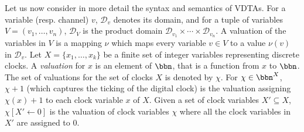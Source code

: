 Let us now consider in more detail the syntax and semantics of VDTAs.
%
For a variable (resp. channel) $v$, ${\mathcal D}_v$ denotes its domain,
and for a tuple of variables $V= (v_1, \ldots, v_n)$,
${\mathcal D}_V$ is the product domain ${\mathcal D}_{v_1} \times \cdots \times {\mathcal D}_{v_n}$.
A valuation of the variables in $V$
is a mapping $\nu$ which maps every variable $v \in V$ to a value $\nu(v)$ in ${\mathcal D}_v$.
%
Let $X=\{x_1,\ldots, x_k\}$ be a finite set of integer variables representing discrete clocks.
%
A {\em valuation} for $x$ is an element of $\bbn$, that is a function from $x$ to $\bbn$.
The set of valuations for the set of clocks $X$ is denoted by $\chi$.
%
For $\chi\in\bbn^X$, $\chi+1$ (which captures the ticking of the digital clock) is the valuation assigning $\chi(x)+1$ to each clock variable $x$ of $X$.
Given a set of clock variables $X' \subseteq X$, $\chi[X' \leftarrow 0]$ is the valuation of clock variables $\chi$ where all the clock variables in $X'$ are assigned to $0$.
%
